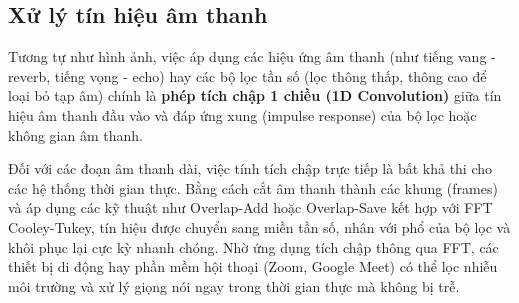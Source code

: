 \subsection{Xử lý tín hiệu âm thanh}

Tương tự như hình ảnh, việc áp dụng các hiệu ứng âm thanh (như tiếng vang - reverb, tiếng vọng - echo) hay các bộ lọc tần số (lọc thông thấp, thông cao để loại bỏ tạp âm) chính là \textbf{phép tích chập 1 chiều (1D Convolution)} giữa tín hiệu âm thanh đầu vào và đáp ứng xung (impulse response) của bộ lọc hoặc không gian âm thanh.

Đối với các đoạn âm thanh dài, việc tính tích chập trực tiếp là bất khả thi cho các hệ thống thời gian thực. Bằng cách cắt âm thanh thành các khung (frames) và áp dụng các kỹ thuật như Overlap-Add hoặc Overlap-Save kết hợp với FFT Cooley-Tukey, tín hiệu được chuyển sang miền tần số, nhân với phổ của bộ lọc và khôi phục lại cực kỳ nhanh chóng. Nhờ ứng dụng tích chập thông qua FFT, các thiết bị di động hay phần mềm hội thoại (Zoom, Google Meet) có thể lọc nhiễu môi trường và xử lý giọng nói ngay trong thời gian thực mà không bị trễ.